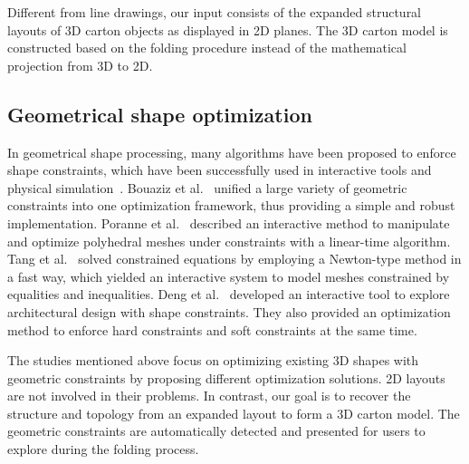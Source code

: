 Different from line drawings, our input consists of the expanded structural layouts of 3D carton objects as displayed in 2D planes.
%
The 3D carton model is constructed based on the folding procedure instead of the mathematical projection from 3D to 2D.

\subsection{Geometrical shape optimization}
In geometrical shape processing, many algorithms have been proposed to enforce shape constraints, which have been successfully used in interactive tools and physical simulation~\cite{Botsch:2006:PCP:1281957.1281959,Igarashi:2005:ASM:1186822.1073323}. 
Bouaziz et al.~\cite{Bouaziz:2012:SSD:2346796.2346802} unified a large variety of geometric constraints into one optimization framework, thus providing a simple and robust implementation. 
Poranne et al.~\cite{Poranne2013Interactive} described an interactive method to manipulate and optimize polyhedral meshes under constraints with a linear-time algorithm. 
%
Tang et al.~\cite{Tang:2014:FPM:2601097.2601213} solved constrained equations by employing a Newton-type method in a fast way, which yielded an interactive system to model meshes constrained by equalities and inequalities. 
Deng et al.~\cite{Deng2015} developed an interactive tool to explore architectural design with shape constraints.
They also provided an optimization method to enforce hard constraints and soft constraints at the same time. 

The studies mentioned above focus on optimizing existing 3D shapes with geometric constraints by proposing different optimization solutions.
%
2D layouts are not involved in their problems.
In contrast, our goal is to recover the structure and topology from an expanded layout to form a 3D carton model.
The geometric constraints are automatically detected and presented for users to explore during the folding process.  



